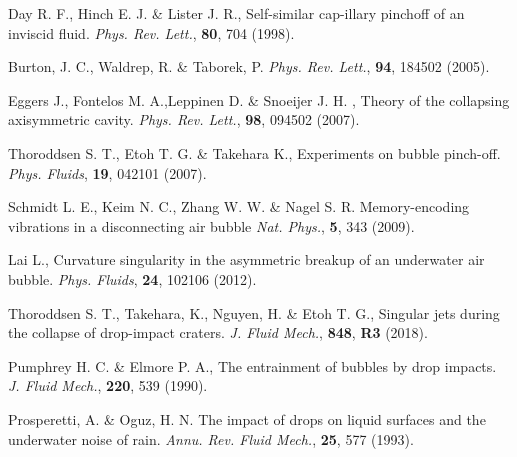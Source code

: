 \documentclass[10pt, a4paper]{article}
\begin{document}
\begin{thebibliography}{9}

      {Day R. F., Hinch E. J. \& Lister J. R.}, %
      Self-similar cap-illary pinchoff of an inviscid fluid.
      {\it Phys. Rev. Lett.}, {\bf 80}, 704 (1998).
        
        {Burton, J. C., Waldrep, R. \& Taborek, P.} %
        {\it Phys. Rev. Lett.}, {\bf 94}, 184502 (2005).

        {Eggers J., Fontelos M. A.,Leppinen D. \& Snoeijer J. H. },
        Theory  of  the  collapsing  axisymmetric  cavity.
        {\it Phys. Rev. Lett.}, {\bf 98}, 094502 (2007).
        
        {Thoroddsen S. T., Etoh T. G. \& Takehara K., 
        Experiments on bubble pinch-off.
        {\it Phys. Fluids}, {\bf 19}, 042101 (2007).}

        {Schmidt L. E., Keim N. C., Zhang W. W. \& Nagel S. R.} 
        Memory-encoding vibrations in a disconnecting air bubble
        {\it Nat. Phys.}, {\bf 5}, 343 (2009).
        
        {Lai L.,}
        Curvature singularity in the asymmetric breakup of an underwater air bubble.
        {\it Phys. Fluids}, {\bf 24}, 102106 (2012).

{Thoroddsen S. T., Takehara, K., Nguyen, H. \& Etoh T. G.},
Singular jets during the collapse of drop-impact craters.
{\it J. Fluid Mech.}, {\bf 848}, {\bf R3} (2018).

Pumphrey H. C. \& Elmore P. A.,
The  entrainment of  bubbles  by  drop  impacts.
{\it J. Fluid Mech.}, {\bf 220}, 539 (1990).

		{Prosperetti, A. \& Oguz, H. N.}
		The impact of drops on liquid surfaces and the underwater noise of rain.
		\textit{Annu. Rev. Fluid Mech.}, \textbf{25}, 577 (1993).
		


\end{thebibliography}
\end{document}
